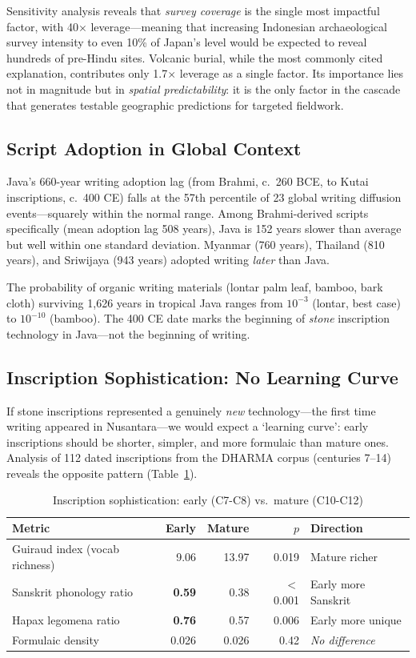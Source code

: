 \documentclass[12pt,a4paper]{article}
\begin{document}
Sensitivity analysis reveals that \textit{survey coverage} is the single most impactful factor, with 40$\times$ leverage---meaning that increasing Indonesian archaeological survey intensity to even 10\% of Japan's level would be expected to reveal hundreds of pre-Hindu sites. Volcanic burial, while the most commonly cited explanation, contributes only 1.7$\times$ leverage as a single factor. Its importance lies not in magnitude but in \textit{spatial predictability}: it is the only factor in the cascade that generates testable geographic predictions for targeted fieldwork.

\subsection{Script Adoption in Global Context}

Java's 660-year writing adoption lag (from Brahmi, c.\ 260 BCE, to Kutai inscriptions, c.\ 400 CE) falls at the 57th percentile of 23 global writing diffusion events---squarely within the normal range. Among Brahmi-derived scripts specifically (mean adoption lag 508 years), Java is 152 years slower than average but well within one standard deviation. Myanmar (760 years), Thailand (810 years), and Sriwijaya (943 years) adopted writing \textit{later} than Java.

The probability of organic writing materials (lontar palm leaf, bamboo, bark cloth) surviving 1,626 years in tropical Java ranges from $10^{-3}$ (lontar, best case) to $10^{-10}$ (bamboo). The 400 CE date marks the beginning of \textit{stone} inscription technology in Java---not the beginning of writing.

\subsection{Inscription Sophistication: No Learning Curve}

If stone inscriptions represented a genuinely \textit{new} technology---the first time writing appeared in Nusantara---we would expect a `learning curve': early inscriptions should be shorter, simpler, and more formulaic than mature ones. Analysis of 112 dated inscriptions from the DHARMA corpus (centuries 7--14) reveals the opposite pattern (Table~\ref{tab:sophistication}).

\begin{table}[h]
\centering
\caption{Inscription sophistication: early (C7-C8) vs.\ mature (C10-C12)}
\label{tab:sophistication}
\begin{tabular}{lrrrl}
\toprule
Metric & Early & Mature & $p$ & Direction \\
\midrule
Guiraud index (vocab richness) & 9.06 & 13.97 & 0.019 & Mature richer \\
Sanskrit phonology ratio & \textbf{0.59} & 0.38 & $<$0.001 & Early more Sanskrit \\
Hapax legomena ratio & \textbf{0.76} & 0.57 & 0.006 & Early more unique \\
Formulaic density & 0.026 & 0.026 & 0.42 & \textit{No difference} \\
\bottomrule
\end{tabular}
\end{table}
\end{document}

